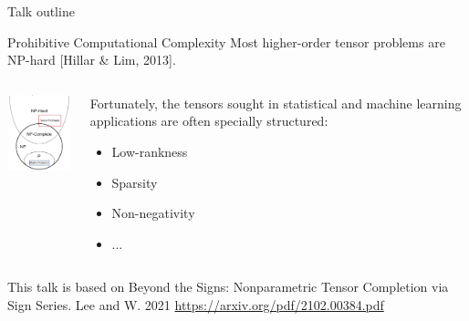 \documentclass[10pt, mathserif]{beamer} %
\theoremstyle{definition}
\theoremstyle{plain}
\begin{document}
\begin{frame}[noframenumbering]{Talk outline} 
 \begin{alertblock}{Prohibitive Computational Complexity}
Most higher-order tensor problems are NP-hard [Hillar \& Lim, 2013].
\end{alertblock}


\begin{columns}[T] \begin{column}{.4\textwidth}
\centering
\includegraphics[width=3cm]{Figures/NP.png}
\end{column}%
\hfill%
\begin{column}{.6\textwidth}
Fortunately, the tensors sought in statistical and machine learning applications are often \color{red}specially structured:
\begin{itemize}
\item Low-rankness
\item Sparsity
\item Non-negativity
\item ...
\end{itemize}
\end{column}%
\end{columns}

\begin{block}{This talk is based on}
{\footnotesize {\color{blue}Beyond the Signs: Nonparametric Tensor Completion via Sign Series.} Lee and W. 2021
\url{https://arxiv.org/pdf/2102.00384.pdf}}
\end{block}
\end{frame}
\end{document}
